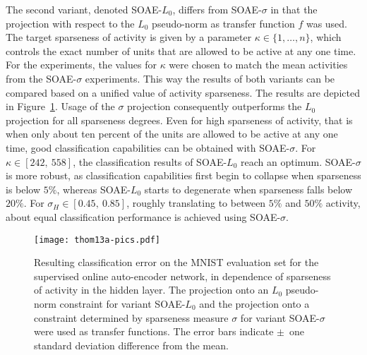 \documentclass[twoside,11pt]{article}
\newcommand{\intervalcc}[2]{\left[#1,\ #2\right]}
\newcommand{\0}{\mathcal{O}}
\newcommand{\discint}[2]{\{#1,\dotsc,#2\}}
\newcommand{\inint}[2]{\in\discint{#1}{#2}}
\begin{document}
The second variant, denoted SOAE-$L_0$, differs from SOAE-$\sigma$ in that the projection with respect to the $L_0$ pseudo-norm as transfer function $f$ was used.
The target sparseness of activity is given by a parameter $\kappa\inint{1}{n}$, which controls the exact number of units that are allowed to be active at any one time.
For the experiments, the values for $\kappa$ were chosen to match the mean activities from the SOAE-$\sigma$ experiments.
This way the results of both variants can be compared based on a unified value of activity sparseness.
The results are depicted in Figure~\ref{fig:soae-results-mnist}.
Usage of the $\sigma$ projection consequently outperforms the $L_0$ projection for all sparseness degrees.
Even for high sparseness of activity, that is when only about ten percent of the units are allowed to be active at any one time, good classification capabilities can be obtained with SOAE-$\sigma$.
For $\kappa\in\intervalcc{242}{558}$, the classification results of SOAE-$L_0$ reach an optimum.
SOAE-$\sigma$ is more robust, as classification capabilities first begin to collapse when sparseness is below $5\%$, whereas SOAE-$L_0$ starts to degenerate when sparseness falls below $20\%$.
For $\sigma_H\in\intervalcc{0.45}{0.85}$, roughly translating to between $5\%$ and $50\%$ activity, about equal classification performance is achieved using SOAE-$\sigma$.

\begin{figure}[p]
  \centering
  \texttt{[image: thom13a-pics.pdf]}
  \caption{Resulting classification error on the MNIST evaluation set for the supervised online auto-encoder network, in dependence of sparseness of activity in the hidden layer. The projection onto an $L_0$ pseudo-norm constraint for variant SOAE-$L_0$ and the projection onto a constraint determined by sparseness measure $\sigma$ for variant SOAE-$\sigma$ were used as transfer functions. The error bars indicate $\pm$~one standard deviation difference from the mean.}
  \label{fig:soae-results-mnist}
\end{figure}
\end{document}
